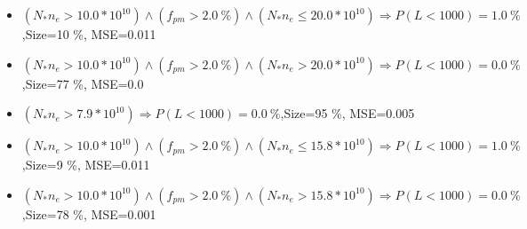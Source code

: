\documentclass[numbered]{CSL}
\begin{document}
\begin{itemize}
\item $(N_* n_e > 10.0 * 10^{10}) \land (f_{pm} > 2.0~\%) \land (N_* n_e \leq 20.0 * 10^{10}) \Rightarrow P(L < 1 000) = 1.0~\%$,\hfill Size=10 \%, MSE=0.011
\item $(N_* n_e > 10.0 * 10^{10}) \land (f_{pm} > 2.0~\%) \land (N_* n_e > 20.0 * 10^{10}) \Rightarrow P(L < 1 000) = 0.0~\%$,\hfill Size=77 \%, MSE=0.0
\item $(N_* n_e > 7.9 * 10^{10}) \Rightarrow P(L < 1 000) = 0.0~\%$,\hfill Size=95 \%, MSE=0.005
\item $(N_* n_e > 10.0 * 10^{10}) \land (f_{pm} > 2.0~\%) \land (N_* n_e \leq 15.8 * 10^{10}) \Rightarrow P(L < 1 000) = 1.0~\%$,\hfill Size=9 \%, MSE=0.011
\item $(N_* n_e > 10.0 * 10^{10}) \land (f_{pm} > 2.0~\%) \land (N_* n_e > 15.8 * 10^{10}) \Rightarrow P(L < 1 000) = 0.0~\%$,\hfill Size=78 \%, MSE=0.001
\end{itemize}
\end{document}
